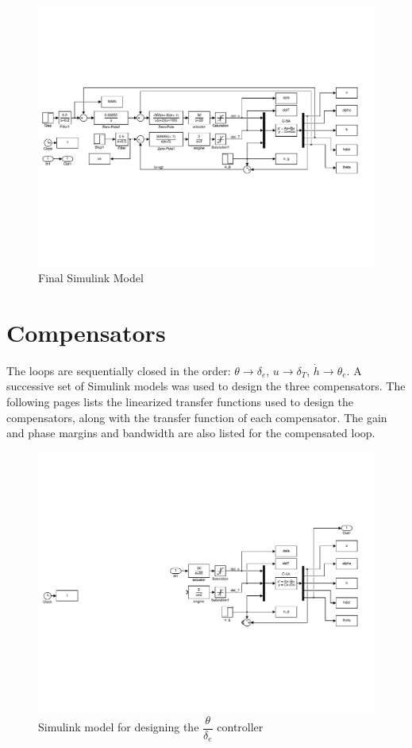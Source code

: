 \documentclass[11pt]{article}
\begin{document}
\begin{figure}[b!]
\begin{center}
\includegraphics[width=1\textwidth]{figures/final_simulink}
\caption{Final Simulink Model}
\end{center}
\end{figure}

\clearpage
\section{Compensators}
The loops are sequentially closed in the order: $\theta\rightarrow\delta_e$, $u\rightarrow\delta_T$, $\dot{h}\rightarrow\theta_e$. A successive set of Simulink models was used to design the three compensators. The following pages lists the linearized transfer functions used to design the compensators, along with the transfer function of each compensator.
The gain and phase margins and bandwidth are also listed for the compensated loop.
\begin{figure}[b!]
\begin{center}
\includegraphics[width=.7\textwidth]{figures/theta}
\caption{Simulink model for designing the $\dfrac{\theta}{\delta_e}$ controller}
\end{center}
\end{figure}
\end{document}
